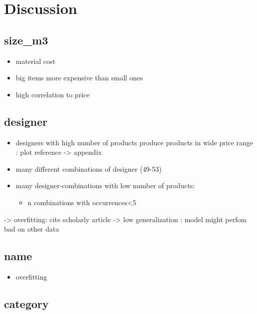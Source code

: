 \documentclass[a4paper, nobind]{templates/ociamthesis}
\providecommand{\tightlist}{%
  \setlength{\itemsep}{0pt}\setlength{\parskip}{0pt}}
\begin{document}
\hypertarget{discussion}{%
\chapter{Discussion}\label{discussion}}

\hypertarget{size_m3}{%
\section{size\_m3}\label{size_m3}}

\begin{itemize}
\tightlist
\item
  material cost
\item
  big items more expensive than small ones
\item
  high correlation to price
\end{itemize}

\hypertarget{designer}{%
\section{designer}\label{designer}}

\begin{itemize}
\item
  designers with high number of products produce products in wide price range : plot reference -\textgreater{} appendix
\item
  many different combinations of designer (49-53)
\item
  many designer-combinations with low number of products:

  \begin{itemize}
  \tightlist
  \item
    n combinations with occurrences\textless{}5
  \end{itemize}
\end{itemize}

-\textgreater{} overfitting: cite scholarly article
-\textgreater{} low generalization : model might perfom bad on other data

\hypertarget{name}{%
\section{name}\label{name}}

\begin{itemize}
\tightlist
\item
  overfitting
\end{itemize}

\hypertarget{category}{%
\section{category}\label{category}}
\end{document}
